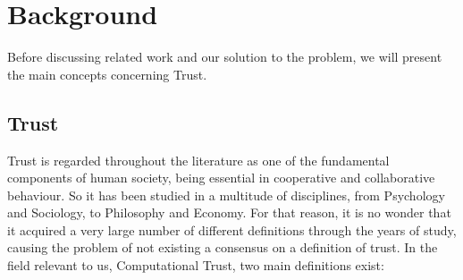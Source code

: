 \section{Background}
\label{sec:Background}



Before discussing related work and our solution to the problem, we will present the main concepts concerning Trust.

\subsection{Trust}
Trust is regarded throughout the literature as one of the fundamental components of human society, being essential in cooperative and collaborative behaviour. So it has been studied in a multitude of disciplines, from Psychology and Sociology, to Philosophy and Economy\cite{Sabater2005}. For that reason, it is no wonder that it acquired a very large number of different definitions through the years of study, causing the problem of not existing a consensus on a definition of trust\cite{Castelfranchi2010}. In the field relevant to us, Computational Trust, two main definitions exist:
\begin{itemize}
	
\end{itemize}